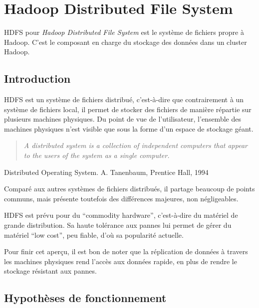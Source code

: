 \section{Hadoop Distributed File System}
\label{sec:hdfs}
\par HDFS pour \textit{Hadoop Distributed File System} est le système de fichiers propre à Hadoop. C'est le composant en charge du stockage des données dans un cluster Hadoop.

\subsection{Introduction}
\label{sec:introduction}

\par HDFS est un système de fichiers distribué, c'est-à-dire que contrairement à un système de fichiers local, il permet de stocker des fichiers de manière répartie sur plusieurs machines physiques. Du point de vue de l'utilisateur, l'ensemble des machines physiques n'est visible que sous la forme d'un espace de stockage géant. 

\begin{quote}
  \emph{A distributed system is a collection of independent computers that appear to the users of the system as a single computer.}
\end{quote}

\begin{flushright}
  Distributed Operating System. A. Tanenbaum, Prentice 
  Hall, 1994
\end{flushright}

\par Comparé aux autres systèmes de fichiers distribués, il partage beaucoup de points communs, mais présente toutefois des différences majeures, non négligeables.

\par HDFS est prévu pour du ``commodity hardware'', c'est-à-dire du matériel de grande distribution. Sa haute tolérance aux pannes lui permet de gérer du matériel ``low cost'', peu fiable, d'où sa popularité actuelle.

\par Pour finir cet aperçu, il est bon de noter que la réplication de données à travers les machines physiques rend l'accès aux données rapide, en plus de rendre le stockage résistant aux pannes.   

\subsection{Hypothèses de fonctionnement}
\label{sec:hypoth-de-fonct}

